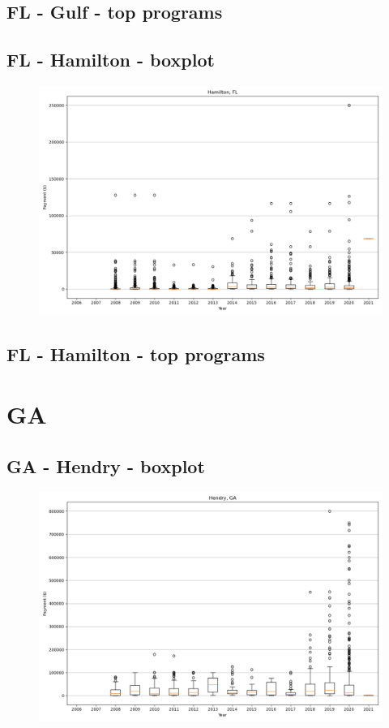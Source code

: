 \subsection*{FL - Gulf - top programs}

\newpage
\subsection*{FL - Hamilton - boxplot}
\begin{figure}[h]
\centering
\includegraphics[width=7in]{../output/boxplots/counties/Hamilton-FL_boxplot.png}
\end{figure}


\subsection*{FL - Hamilton - top programs}

\newpage
\section*{GA}
\subsection*{GA - Hendry - boxplot}
\begin{figure}[h]
\centering
\includegraphics[width=7in]{../output/boxplots/counties/Hendry-GA_boxplot.png}
\end{figure}


